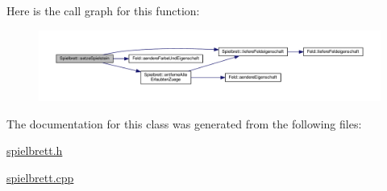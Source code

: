 Here is the call graph for this function\-:\nopagebreak
\begin{figure}[H]
\begin{center}
\leavevmode
\includegraphics[width=350pt]{classSpielbrett_a1a4f79a33ee43258499cae2040093f46_cgraph}
\end{center}
\end{figure}




The documentation for this class was generated from the following files\-:\begin{DoxyCompactItemize}
\item 
\hyperlink{spielbrett_8h}{spielbrett.\-h}\item 
\hyperlink{spielbrett_8cpp}{spielbrett.\-cpp}\end{DoxyCompactItemize}
